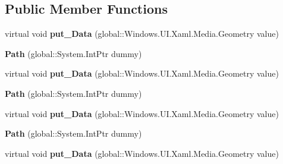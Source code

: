 \subsection*{Public Member Functions}
\begin{DoxyCompactItemize}
\item 
\mbox{\label{class_windows_1_1_u_i_1_1_xaml_1_1_shapes_1_1_path_aa6e757e6f0613691174ca7830b9e8db3}} 
virtual void {\bfseries put\+\_\+\+Data} (global\+::\+Windows.\+U\+I.\+Xaml.\+Media.\+Geometry value)
\item 
\mbox{\label{class_windows_1_1_u_i_1_1_xaml_1_1_shapes_1_1_path_ab5b4d73c18e3c00758722458e89b0dfb}} 
{\bfseries Path} (global\+::\+System.\+Int\+Ptr dummy)
\item 
\mbox{\label{class_windows_1_1_u_i_1_1_xaml_1_1_shapes_1_1_path_aa6e757e6f0613691174ca7830b9e8db3}} 
virtual void {\bfseries put\+\_\+\+Data} (global\+::\+Windows.\+U\+I.\+Xaml.\+Media.\+Geometry value)
\item 
\mbox{\label{class_windows_1_1_u_i_1_1_xaml_1_1_shapes_1_1_path_ab5b4d73c18e3c00758722458e89b0dfb}} 
{\bfseries Path} (global\+::\+System.\+Int\+Ptr dummy)
\item 
\mbox{\label{class_windows_1_1_u_i_1_1_xaml_1_1_shapes_1_1_path_aa6e757e6f0613691174ca7830b9e8db3}} 
virtual void {\bfseries put\+\_\+\+Data} (global\+::\+Windows.\+U\+I.\+Xaml.\+Media.\+Geometry value)
\item 
\mbox{\label{class_windows_1_1_u_i_1_1_xaml_1_1_shapes_1_1_path_ab5b4d73c18e3c00758722458e89b0dfb}} 
{\bfseries Path} (global\+::\+System.\+Int\+Ptr dummy)
\item 
\mbox{\label{class_windows_1_1_u_i_1_1_xaml_1_1_shapes_1_1_path_aa6e757e6f0613691174ca7830b9e8db3}} 
virtual void {\bfseries put\+\_\+\+Data} (global\+::\+Windows.\+U\+I.\+Xaml.\+Media.\+Geometry value)
\item 

\end{DoxyCompactItemize}
